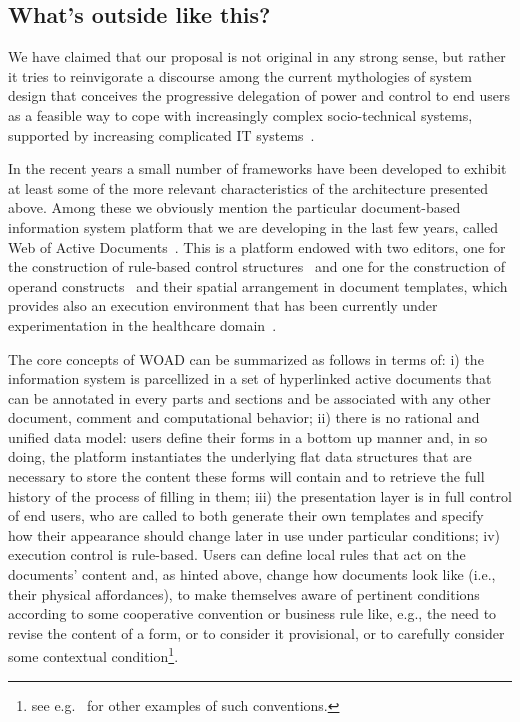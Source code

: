 \documentclass{article}
\begin{document}
\subsection{What's outside like this?}
\label{subsec:rw}

We have claimed that our proposal is not original in any strong sense, but rather it tries to reinvigorate a discourse among the current mythologies of system design that conceives the progressive delegation of power and control to end users as a feasible way to cope with increasingly complex socio-technical systems, supported by increasing complicated IT systems~\citep{latour_interobjectivity_1996}. 

In the recent years a small number of frameworks have been developed to exhibit at least some of the more relevant characteristics of the architecture presented above. Among these we obviously mention the particular document-based information system platform that we are developing in the last few years, called Web of Active Documents~\citep[WOAD, ][]{cabitza_woad:_2010,cabitza_web_2011}. This is a platform endowed with two editors, one for the construction of rule-based control structures~\citep[therein called mechanisms, ][]{cabitza_providing_2012} and one for the construction of operand constructs~\cite[atomic data structures called datoms, ][]{cabitza_tailorable_2011} and their spatial arrangement in document templates, which provides also an execution environment that has been currently under experimentation in the healthcare domain~\citep{cabitza_woad_2011,cabitza_rule-based_2012}. 

The core concepts of WOAD can be summarized as follows in terms of: i) the information system is parcellized in a set of hyperlinked active documents that can be annotated in every parts and sections and be associated with any other document, comment and computational behavior; ii) there is no rational and unified data model: users define their forms in a bottom up manner and, in so doing, the platform instantiates the underlying flat data structures that are necessary to store the content these forms will contain and to retrieve the full history of the process of filling in them; iii) the presentation layer is in full control of end users, who are called to both generate their own templates and specify how their appearance should change later in use under particular conditions; iv) execution control is rule-based. Users can define local rules that act on the documents' content and, as hinted above, change how documents look like (i.e., their physical affordances), to make themselves aware of pertinent conditions according to some cooperative convention or business rule like, e.g., the need to revise the content of a form, or to consider it provisional, or to carefully consider some contextual condition\footnote{see e.g.~\citet{cabitza_leveraging_2009} for other examples of such conventions.}.
\end{document}
